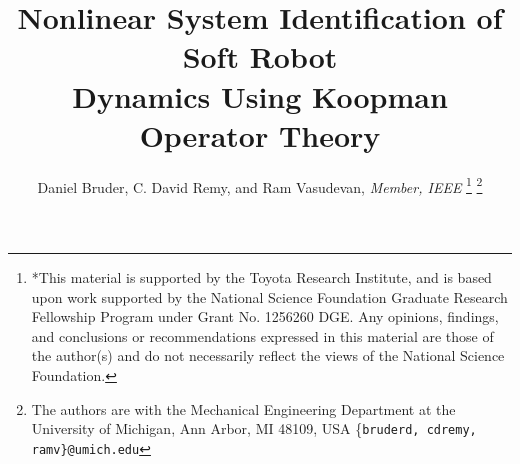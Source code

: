 \documentclass[letterpaper, 10 pt, conference]{ieeeconf}
\title{\LARGE \bf
Nonlinear System Identification of Soft Robot \\ Dynamics Using Koopman Operator Theory
}
\author{Daniel Bruder, %
        C. David Remy, %
        and Ram Vasudevan, \emph{Member, IEEE} %
\thanks{*This material is supported by the Toyota Research Institute, and is based upon work supported by the National Science Foundation Graduate Research Fellowship Program under Grant No. 1256260 DGE. Any opinions, findings, and conclusions or recommendations expressed in this material are those of the author(s) and do not necessarily reflect the views of the National Science Foundation.}%
\thanks{The authors are with the Mechanical Engineering Department at the 
        University of Michigan, Ann Arbor, MI 48109, USA
        \{\tt\small bruderd, cdremy, ramv\}@umich.edu}%
}
\begin{document}
\maketitle
\thispagestyle{empty}
\pagestyle{empty}

\begin{abstract}

\end{abstract}

\IEEEpeerreviewmaketitle









% 




\end{document}
